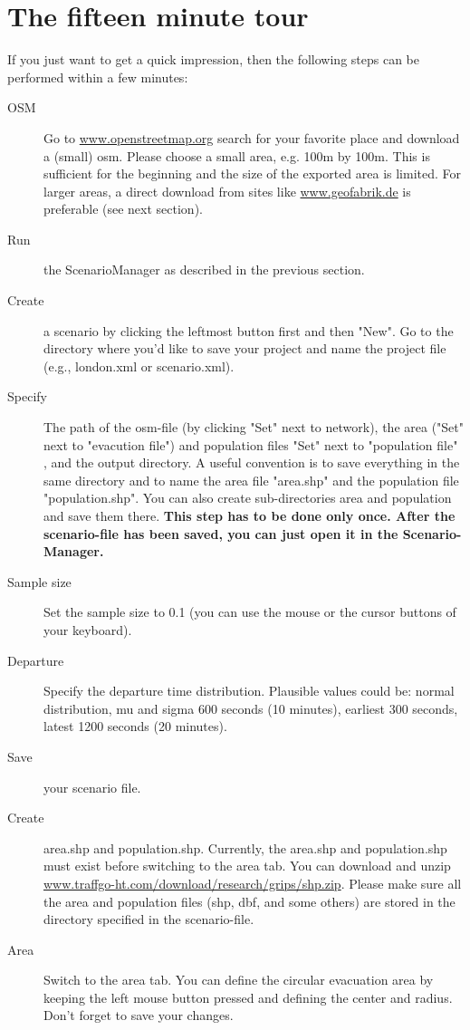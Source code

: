 \section{The fifteen minute tour}\label{evac:section:fifteenminute}
If you just want to get a quick impression, then the following steps can be performed within a few minutes:
\begin{description}
\item[OSM] Go to \url{www.openstreetmap.org} search for your favorite place and download a (small) osm. Please choose a small area, e.g. 100m by 100m. This is sufficient for the beginning and the size of the exported area is limited. For larger areas, a direct download from sites like \url{www.geofabrik.de} is preferable (see next section).
\item[Run] the ScenarioManager as described in the previous section.
\item[Create] a scenario by clicking the leftmost button first and then "New". Go to the directory where you'd like to save your project and name the project file (e.g., london.xml or scenario.xml).
\item[Specify] The path of the osm-file (by clicking "Set" next to network), the area ("Set" next to "evacution file") and population files "Set" next to "population file" , and the output directory.
A useful convention is to save everything in the same directory and to name the area file "area.shp" and the population file "population.shp". You can also create sub-directories area and population and save them there.
\textbf{This step has to be done only once. After the scenario-file has been saved, you can just open it in the Scenario-Manager.}
\item[Sample size] Set the sample size to 0.1 (you can use the mouse or the cursor buttons of your keyboard).
\item[Departure] Specify the departure time distribution. Plausible values could be: normal distribution, mu and sigma 600 seconds (10 minutes), earliest 300 seconds, latest 1200 seconds (20 minutes).
\item[Save] your scenario file.
\item[Create] area.shp and population.shp. Currently, the area.shp and population.shp must exist before switching to the area tab. You can download and unzip \url{www.traffgo-ht.com/download/research/grips/shp.zip}. Please make sure all the area and population files (shp, dbf, and some others) are stored in the directory specified in the scenario-file.
\item[Area] Switch to the area tab. You can define the circular evacuation area by keeping the left mouse button pressed and defining the center and radius. Don't forget to save your changes.

\end{description}
